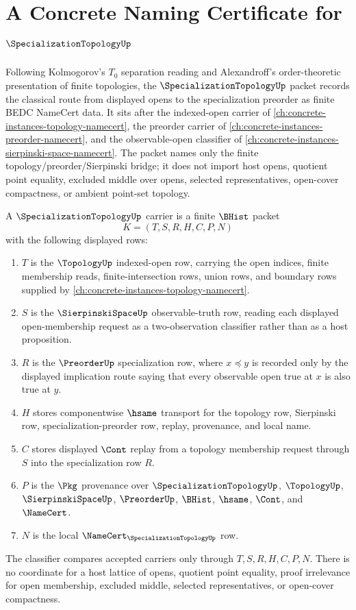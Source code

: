 \chapter{A Concrete Naming Certificate for $\SpecializationTopologyUp$}
\label{ch:concrete-instances-specialization-topology-namecert}

Following Kolmogorov's $T_0$ separation reading and Alexandroff's order-theoretic presentation of finite topologies, the $\SpecializationTopologyUp$ packet records the classical route from displayed opens to the specialization preorder as finite BEDC NameCert data. It sits after the indexed-open carrier of \autoref{ch:concrete-instances-topology-namecert}, the preorder carrier of \autoref{ch:concrete-instances-preorder-namecert}, and the observable-open classifier of \autoref{ch:concrete-instances-sierpinski-space-namecert}. The packet names only the finite topology/preorder/Sierpinski bridge; it does not import host opens, quotient point equality, excluded middle over opens, selected representatives, open-cover compactness, or ambient point-set topology.

\begin{definition}
\label{def:specialization-topology-carrier}
A $\SpecializationTopologyUp$ carrier is a finite $\BHist$ packet
$$
K=(T,S,R,H,C,P,N)
$$
with the following displayed rows:
\begin{enumerate}
\item $T$ is the $\TopologyUp$ indexed-open row, carrying the open indices, finite membership reads, finite-intersection rows, union rows, and boundary rows supplied by \autoref{ch:concrete-instances-topology-namecert}.
\item $S$ is the $\SierpinskiSpaceUp$ observable-truth row, reading each displayed open-membership request as a two-observation classifier rather than as a host proposition.
\item $R$ is the $\PreorderUp$ specialization row, where $x \preceq y$ is recorded only by the displayed implication route saying that every observable open true at $x$ is also true at $y$.
\item $H$ stores componentwise $\hsame$ transport for the topology row, Sierpinski row, specialization-preorder row, replay, provenance, and local name.
\item $C$ stores displayed $\Cont$ replay from a topology membership request through $S$ into the specialization row $R$.
\item $P$ is the $\Pkg$ provenance over $\SpecializationTopologyUp$, $\TopologyUp$, $\SierpinskiSpaceUp$, $\PreorderUp$, $\BHist$, $\hsame$, $\Cont$, and $\NameCert$.
\item $N$ is the local $\NameCert_{\SpecializationTopologyUp}$ row.
\end{enumerate}
The classifier compares accepted carriers only through $T,S,R,H,C,P,N$. There is no coordinate for a host lattice of opens, quotient point equality, proof irrelevance for open membership, excluded middle, selected representatives, or open-cover compactness.
\end{definition}

